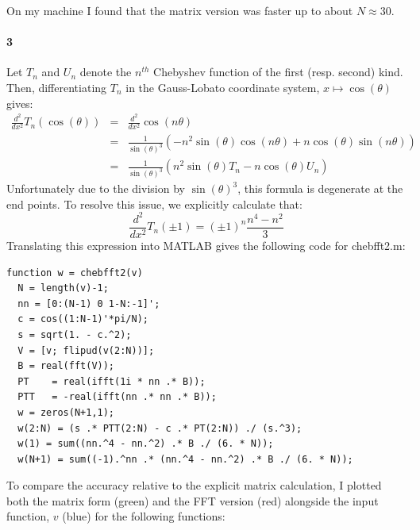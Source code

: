 \documentclass{article}
\begin{document}
On my machine I found that the matrix version was faster up to about $N \approx 30$.

\paragraph{3}
Let $T_n$ and $U_n$ denote the $n^{th}$ Chebyshev function of the first (resp. second) kind.  Then, differentiating $T_n$ in the Gauss-Lobato coordinate system, $x \mapsto \cos(\theta)$ gives:
\begin{eqnarray*}
\frac{d^2}{dx^2} T_n ( \cos(\theta) ) & = & \frac{d^2}{dx^2} \cos(n\theta) \\
 & = & \frac{1}{\sin(\theta)^3} \left( -n^2 \sin(\theta) \cos(n \theta) + n \cos(\theta) \sin(n \theta) \right) \\
 & = & \frac{1}{\sin(\theta)^3} \left( n^2 \sin(\theta) T_n - n \cos(\theta) U_n \right)
\end{eqnarray*}
Unfortunately due to the division by $\sin(\theta)^3$, this formula is degenerate at the end points.  To resolve this issue, we explicitly calculate that:
\[ \frac{d^2}{dx^2} T_n( \pm 1 ) = (\pm 1)^n \frac{n^4 - n^2}{3} \]
Translating this expression into MATLAB gives the following code for chebfft2.m:

\begin{verbatim}
function w = chebfft2(v)
  N = length(v)-1; 
  nn = [0:(N-1) 0 1-N:-1]';
  c = cos((1:N-1)'*pi/N);
  s = sqrt(1. - c.^2);
  V = [v; flipud(v(2:N))];
  B = real(fft(V));
  PT    = real(ifft(1i * nn .* B));
  PTT   = -real(ifft(nn .* nn .* B));
  w = zeros(N+1,1);
  w(2:N) = (s .* PTT(2:N) - c .* PT(2:N)) ./ (s.^3);
  w(1) = sum((nn.^4 - nn.^2) .* B ./ (6. * N));
  w(N+1) = sum((-1).^nn .* (nn.^4 - nn.^2) .* B ./ (6. * N));
\end{verbatim}

To compare the accuracy relative to the explicit matrix calculation, I plotted both the matrix form (green) and the FFT version (red) alongside the input function, $v$ (blue) for the following functions:
\end{document}
